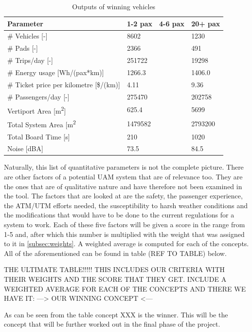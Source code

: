 \begin{table}[H]
\captionsetup{justification=centering}
\caption{Outputs of winning vehicles}
\label{outputswin}
\begin{tabular}{llll}
\hline
\textbf{Parameter}                          & \textbf{1-2 pax} & \textbf{4-6 pax} & \textbf{20+ pax} \\ \hline
\# Vehicles {[}-{]}                         & 8602             &                  & 1230             \\
\# Pads {[}-{]}                             & 2366             &                  & 491              \\
\# Trips/day {[}-{]}                        & 251722           &                  & 19298            \\
\# Energy usage {[}Wh/(pax*km){]}           & 1266.3           &                  & 1406.0           \\
\# Ticket price per kilometre {[}\$/(km){]} & 4.11             &                  & 9.36             \\
\# Passengers/day {[}-{]}                   & 275470           &                  & 202758           \\
Vertiport Area {[}m\textsuperscript{2}{]}   & 625.4            &                  & 5699             \\
Total System Area {[}m\textsuperscript{2}   & 1479582          &                  & 2793200          \\
Total Board Time {[}s{]}                    & 210              &                  & 1020             \\
Noise {[}dBA{]}                             & 73.5             &                  & 84.5             \\ \hline
\end{tabular}
\end{table}


Naturally, this list of quantitative parameters is not the complete picture. There are other factors of a potential UAM system that are of relevance too. They are the ones that are of qualitative nature and have therefore not been examined in the tool. The factors that are looked at are the safety, the passenger experience, the ATM/UTM efforts needed, the susceptibility to harsh weather conditions and the modifications that would have to be done to the current regulations for a system to work. Each of these five factors will be given a score in the range from 1-5 and, after which this number is multiplied with the weight that was assigned to it in \autoref{subsec:weights}. A weighted average is computed for each of the concepts. All of the aforementioned can be found in table (REF TO TABLE) below. 

THE ULTIMATE TABLE!!!!! THIS INCLUDES OUR CRITERIA WITH THEIR WEIGHTS AND THE SCORE THAT THEY GET. INCLUDE A WEIGHTED AVERAGE FOR EACH OF THE CONCEPTS AND THERE WE HAVE IT: ---> OUR WINNING CONCEPT <--- 





As can be seen from the table concept XXX is the winner. This will be the concept that will be further worked out in the final phase of the project. 


